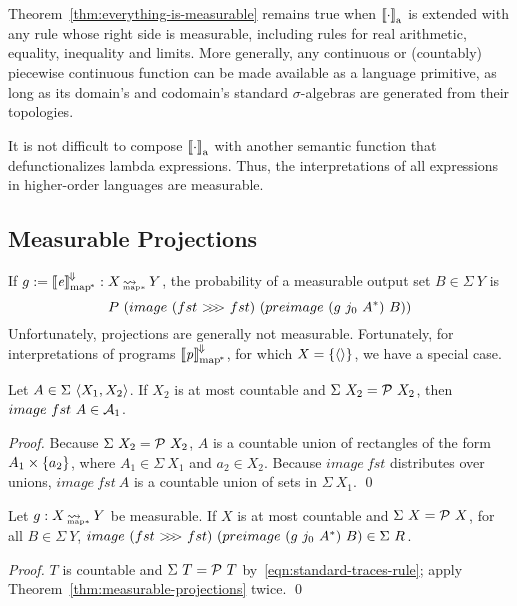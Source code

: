 \documentclass{llncs}
\newcommand{\arrow}{\rightsquigarrow}
\newcommand{\conv}{^{\mspace{-2mu}\Downarrow\mspace{-2mu}}}
\newcommand{\meaningofconv}[1]{\left\llbracket{#1}\right\rrbracket\conv}
\newcommand{\arrowcomp}{\ensuremath{{>}\mspace{-6mu}{>}\mspace{-6mu}{>}}}
\newcommand{\gen}{_\mathrm{a}}
\newcommand{\pmap}{_\mathrm{map^{\mspace{-2mu}*}}}
\DeclareMathOperator{\pmapto}{\arrow_{\mspace{-22mu}_{\mathrm{map*}}}}
\begin{document}
Theorem~\ref{thm:everything-is-measurable} remains true when $\meaningof{\cdot}\gen$ is extended with any rule whose right side is measurable, including rules for real arithmetic, equality, inequality and limits.
More generally, any continuous or (countably) piecewise continuous function can be made available as a language primitive, as long as its domain's and codomain's standard $\sigma$-algebras are generated from their topologies.

It is not difficult to compose $\meaningof{\cdot}\gen$ with another semantic function that defunctionalizes lambda expressions.
Thus, the interpretations of all expressions in higher-order languages are measurable.

\subsection{Measurable Projections}

If $g := \meaningofconv{\mathit{e}}\pmap : X \pmapto Y$, the probability of a measurable output set $B \in \Sigma~Y$ is
\begin{equation}
	P~(image~(fst~\arrowcomp~fst)~(preimage~(g~j_0~A^*)~B))
\end{equation}
Unfortunately, projections are generally not measurable.
Fortunately, for interpretations of programs $\meaningofconv{\mathit{p}}\pmap$, for which $X = \{{\langle{}\rangle}\}$, we have a special case.

\begin{theorem}
\label{thm:measurable-projections}
Let $A \in \Sigma~\langle{X_1,X_2}\rangle$.
If $X_2$ is at most countable and $\Sigma~X_2 = \mathcal{P}~X_2$, then $image~fst~A \in \mathcal{A}_1$.%
\end{theorem}
\begin{proof}
Because $\Sigma~X_2 = \mathcal{P}~X_2$, $A$ is a countable union of rectangles of the form $A_1 \times \{{a_2}\}$, where $A_1 \in \Sigma~X_1$ and $a_2 \in X_2$.
Because $image~fst$ distributes over unions, $image~fst~A$ is a countable union of sets in $\Sigma~X_1$.
\qed
\end{proof}

\begin{theorem}
Let $g : X \pmapto Y$ be measurable.
If $X$ is at most countable and $\Sigma~X = \mathcal{P}~X$, for all $B \in \Sigma~Y$, $image~(fst~\arrowcomp~fst)~(preimage~(g~j_0~A^*)~B) \in \Sigma~R$.
\end{theorem}
\begin{proof}
$T$ is countable and $\Sigma~T = \mathcal{P}~T$ by~\eqref{eqn:standard-traces-rule}; apply Theorem~\ref{thm:measurable-projections} twice.
\qed
\end{proof}
\end{document}
